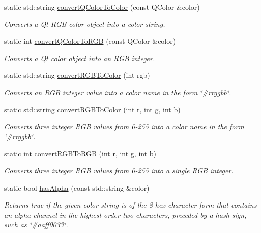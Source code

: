 \begin{DoxyCompactItemize}
static std\+::string \mbox{\hyperlink{classGColor_a2ad78585a77dad65eb23299714545f7c}{convert\+Q\+Color\+To\+Color}} (const Q\+Color \&color)
\begin{DoxyCompactList}\small\item\em Converts a Qt R\+GB color object into a color string. \end{DoxyCompactList}\item 
static int \mbox{\hyperlink{classGColor_a30f06933a10f00500d6b7991f8b61dde}{convert\+Q\+Color\+To\+R\+GB}} (const Q\+Color \&color)
\begin{DoxyCompactList}\small\item\em Converts a Qt color object into an R\+GB integer. \end{DoxyCompactList}\item 
static std\+::string \mbox{\hyperlink{classGColor_a64353dd79967412aeebe46219e4a71df}{convert\+R\+G\+B\+To\+Color}} (int rgb)
\begin{DoxyCompactList}\small\item\em Converts an R\+GB integer value into a color name in the form {\ttfamily \char`\"{}\#rrggbb\char`\"{}}. \end{DoxyCompactList}\item 
static std\+::string \mbox{\hyperlink{classGColor_a906729a293e62f8d112037016af21f9f}{convert\+R\+G\+B\+To\+Color}} (int r, int g, int b)
\begin{DoxyCompactList}\small\item\em Converts three integer R\+GB values from 0-\/255 into a color name in the form {\ttfamily \char`\"{}\#rrggbb\char`\"{}}. \end{DoxyCompactList}\item 
static int \mbox{\hyperlink{classGColor_a7c4acb134cfa913f8a127b300a4b10a0}{convert\+R\+G\+B\+To\+R\+GB}} (int r, int g, int b)
\begin{DoxyCompactList}\small\item\em Converts three integer R\+GB values from 0-\/255 into a single R\+GB integer. \end{DoxyCompactList}\item 
static bool \mbox{\hyperlink{classGColor_ac3793cbac78369b75b4d8967d8cb2b7a}{has\+Alpha}} (const std\+::string \&color)
\begin{DoxyCompactList}\small\item\em Returns true if the given color string is of the 8-\/hex-\/character form that contains an alpha channel in the highest order two characters, preceded by a hash sign, such as \char`\"{}\#aaff0033\char`\"{}. \end{DoxyCompactList}\item 

\end{DoxyCompactItemize}
